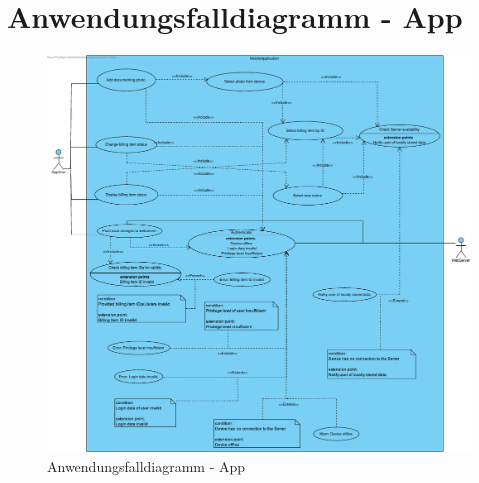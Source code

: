 \newpage

\section{Anwendungsfalldiagramm - App}

\begin{figure}[h]
    \centering
    \includegraphics[width=\linewidth]{img/diagrams/Mobile_Application.pdf}
    \caption{Anwendungsfalldiagramm - App}
    \label{fig:anwendungsfalldiagramm-app}
\end{figure}
\centering
